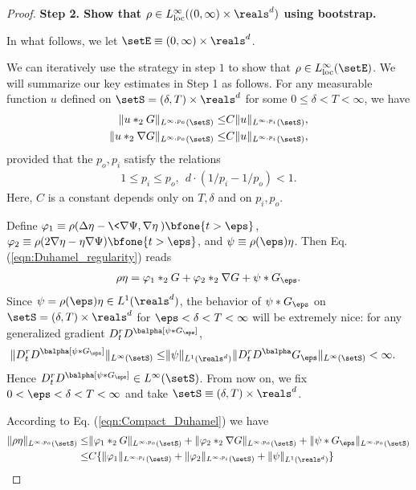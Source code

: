 \documentclass[11pt]{article}
\begin{document}
\begin{proof}
\noindent
{\bf Step 2. Show that $\rho \in L^\infty_{\rm loc}((0,\infty)\times \reals^d)$ using bootstrap. }

In what follows, we let $\setE\equiv (0,\infty)\times\reals^d$.

We can iteratively use the strategy in step $1$ to show that $\rho \in L^\infty_{\rm loc}(\setE)$. We will summarize our key estimates in Step 1 as follows. For any measurable function $u$ defined on $\setS = (\delta, T) \times \reals^d$ for some $0 \le \delta < T < \infty$, we have 
\begin{align}
\| u *_2 G  \|_{L^{\infty, p_o}(\setS)} \le& C \| u \|_{L^{\infty, p_i}(\setS)},  \label{eqn:Extremely_powerful_inequalies3}\\
\| u *_2 \nabla G  \|_{L^{\infty, p_o}(\setS)} \le& C \| u \|_{L^{\infty, p_i}(\setS)}, \label{eqn:Extremely_powerful_inequalies4}
\end{align}
provided that the $p_o, p_i$ satisfy the relations
\begin{align}\label{eqn:Condition_for_in_out}
1 \le p_i \le p_o,  ~~ d\cdot (1/p_i - 1/p_o) < 1. 
\end{align}
Here, $C$ is a constant depends only on $T, \delta$ and on $p_i, p_o$.

Define $\varphi_1 \equiv \rho(\Delta \eta - \< \nabla \Psi, \nabla \eta\>) \bfone\{ t > \eps \}$, $\varphi_2 \equiv \rho (2 \nabla \eta - \eta \nabla \Psi) \bfone\{ t > \eps \}$, and $\psi \equiv \rho(\eps) \eta$. Then Eq. (\ref{eqn:Duhamel_regularity}) reads 
\begin{align}\label{eqn:Compact_Duhamel}
\rho \eta = \varphi_1 *_2 G + \varphi_2 *_2 \nabla G + \psi * G_\eps.
\end{align}
Since $\psi = \rho(\eps) \eta \in L^1(\reals^d)$, the behavior of $\psi * G_\eps$ on $\setS = (\delta, T) \times \reals^d$ for $\eps < \delta < T < \infty$ will be extremely nice: for any generalized gradient $D_t^r D^\balpha [\psi * G_\eps]$, 
\begin{align}
\| D_t^r D^\balpha [\psi * G_\eps] \|_{L^{\infty}(\setS)} \le & \| \psi \|_{L^1(\reals^d)} \| D_t^r D^\balpha G_\eps \|_{L^\infty(\setS)} < \infty. 
\end{align}
Hence $D_t^r D^\balpha [\psi * G_\eps] \in L^\infty(\setS)$. From now on, we fix $0 < \eps < \delta < T < \infty$ and take $\setS \equiv (\delta, T) \times \reals^d$.  

According to Eq. (\ref{eqn:Compact_Duhamel}) we have 
\begin{equation}\label{eqn:In_out_iteration}
\begin{aligned}
\| \rho \eta  \|_{L^{\infty, p_o}(\setS)} \le& \| \varphi_1 *_2 G \|_{L^{\infty, p_o}(\setS)} + \| \varphi_2 *_2 \nabla G \|_{L^{\infty, p_o}(\setS)} + \| \psi * G_\eps \|_{L^{\infty, p_o}(\setS)}\\
\le& C\{ \| \varphi_1 \|_{L^{\infty, p_i}(\setS)} + \| \varphi_2 \|_{L^{\infty, p_i}(\setS)} + \|\psi\|_{L^{1}(\reals^d)}\}
\end{aligned}
\end{equation}


\end{proof}
\end{document}
